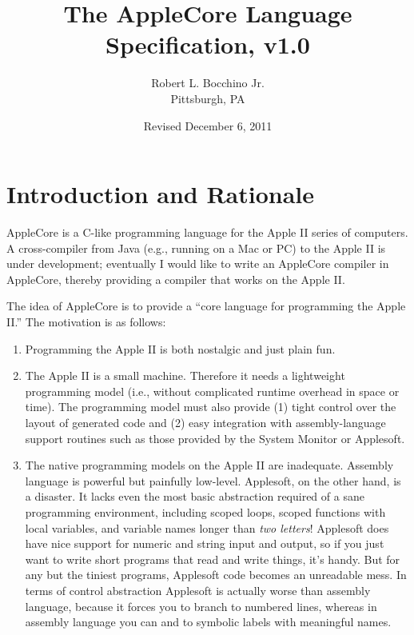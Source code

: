 \documentclass[10pt]{article}
\begin{document}
\title{\bfseries{The AppleCore Language Specification, v1.0}}
%
\author{Robert L. Bocchino Jr.\\
Pittsburgh, PA}
%
\date{Revised December 6, 2011}

\maketitle

\section{Introduction and Rationale}

AppleCore is a C-like programming language for the Apple II series of
computers.  A cross-compiler from Java (e.g., running on a Mac or PC)
to the Apple II is under development; eventually I would like to write
an AppleCore compiler in AppleCore, thereby providing a compiler that
works on the Apple II.

The idea of AppleCore is to provide a ``core language for programming
the Apple II.''  The motivation is as follows:
%
\begin{enumerate}
%
\item Programming the Apple II is both nostalgic and just plain fun.
%
\item The Apple II is a small machine.  Therefore it needs a
  lightweight programming model (i.e., without complicated runtime
  overhead in space or time).  The programming model must also provide
  (1) tight control over the layout of generated code and (2) easy
  integration with assembly-language support routines such as those
  provided by the System Monitor or Applesoft.
%
\item The native programming models on the Apple II are inadequate.
  Assembly language is powerful but painfully low-level.  Applesoft,
  on the other hand, is a disaster.  It lacks even the most basic
  abstraction required of a sane programming environment, including
  scoped loops, scoped functions with local variables, and variable
  names longer than \emph{two letters}!  Applesoft does have nice
  support for numeric and string input and output, so if you just want
  to write short programs that read and write things, it's handy. But
  for any but the tiniest programs, Applesoft code becomes an
  unreadable mess.  In terms of control abstraction Applesoft is
  actually worse than assembly language, because it forces you to
  branch to numbered lines, whereas in assembly language you can
   and  to symbolic labels with meaningful names.
%
\end{enumerate}
\end{document}
